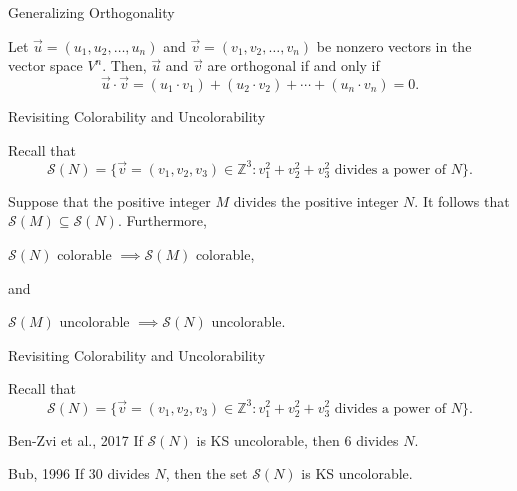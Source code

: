 \documentclass[11pt]{beamer}
\begin{document}
\begin{frame}{Generalizing Orthogonality}

Let $\vec{u} = (u_{1}, u_{2}, \dots, u_{n})$ and $\vec{v} = (v_{1}, v_{2}, \dots, v_{n})$ be nonzero vectors in the vector space $V^{n}$. Then, $\vec{u}$ and $\vec{v}$ are orthogonal if and only if
\[\vec{u} \cdot \vec{v} = (u_{1} \cdot v_{1}) + (u_{2} \cdot v_{2}) + \cdots + (u_{n} \cdot v_{n}) = 0.\]
\end{frame}

\begin{frame}{Revisiting Colorability and Uncolorability}

Recall that
\[\mathcal{S}(N) = \{\vec{v} = (v_{1}, v_{2}, v_{3}) \in \mathbb{Z}^{3} : v_{1}^{2} + v_{2}^{2} + v_{3}^{2} \text{ divides a power of } N\}.\]

\vspace{1.5em}
\pause

Suppose that the positive integer $M$ divides the positive integer $N$. It follows that $\mathcal{S}(M) \subseteq \mathcal{S}(N)$. Furthermore,
\begin{center}
	$\mathcal{S}(N)$ colorable $\implies \mathcal{S}(M)$ colorable,
\end{center}
and
\begin{center}
	$\mathcal{S}(M)$ uncolorable $\implies \mathcal{S}(N)$ uncolorable.
\end{center}

\end{frame}

\begin{frame}{Revisiting Colorability and Uncolorability}

Recall that
\[\mathcal{S}(N) = \{\vec{v} = (v_{1}, v_{2}, v_{3}) \in \mathbb{Z}^{3} : v_{1}^{2} + v_{2}^{2} + v_{3}^{2} \text{ divides a power of } N\}.\]

\vspace{1.5em}

\begin{block}{Ben-Zvi et al., 2017}
	If $\mathcal{S} (N)$ is KS uncolorable, then $6$ divides $N$.
\end{block}

\vspace{1.5em}

\begin{block}{Bub, 1996}
	If $30$ divides $N$, then the set $\mathcal{S} (N)$ is KS uncolorable.
\end{block}

\end{frame}

\end{document}

